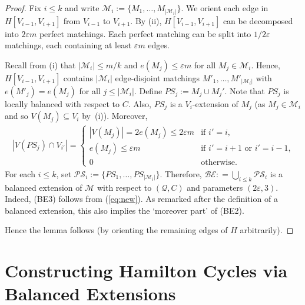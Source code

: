 \documentclass{memo-l}
\def\COMMENT#1{}
\def\eps{\varepsilon}
\numberwithin{section}{chapter}
\numberwithin{equation}{section}
\numberwithin{firstthm}{section}
\numberwithin{figure}{section}
\begin{document}
{\begin{proof}
Fix $i \le k$ and write $\mathcal{M}_i := \{ M_1, \dots, M_{|\mathcal{M}_i|}\}$.
We orient each edge in $H[V_{i-1},V_{i+1}]$ from $V_{i-1}$ to $V_{i+1}$.
By (ii), $H[V_{i-1},V_{i+1}]$ can be decomposed into $2 \eps m$ perfect matchings. 
Each perfect matching can be split into $1/2\eps $ matchings, each containing at least $ \eps m$ edges.%
    \COMMENT{Not sure why we need $1/2\eps $ instead of $1/\eps $ here. Is it because of the rounding? (Allan: Yes, it is due to rounding.)}
Recall from (i) that $|\mathcal{M}_i| \le m/k$ and $e(M_j ) \le \eps m$ for all $M_j  \in \mathcal{M}_i$.
Hence, $H[V_{i-1},V_{i+1}]$ contains $|\mathcal{M}_i|$ edge-disjoint matchings $M'_1, \dots, M'_{|\mathcal{M}_i|}$ with $e(M'_j) = e(M_j)$ for all $j \le |\mathcal{M}_i|$.
Define $PS_j:=M_j \cup M_j'$.
Note that $PS_j$ is locally balanced with respect to $C$.
Also, $PS_j$ is a $V_i$-extension of $M_j$ (as $M_j \in \mathcal{M}_i$ and so $V(M_j) \subseteq V_i$ by~(i)).
Moreover,
\begin{align}\label{eq:new}
	|V(PS_j) \cap V_{i'}|  = \begin{cases}
		|V(M_j)| =2 e(M_j ) \le 2 \eps m & \textrm{if $i' = i$,}\\
		e(M_j ) \le \eps m & \text{if $i' = i+1$ or $i' = i-1$,}\\
		0 & \text{otherwise.}
	\end{cases}
\end{align}
For each $i\le k$, set $\mathcal{PS}_i := \{ PS_1, \dots, PS_{|\mathcal{M}_i|}\}$.
Therefore, $\mathcal{BE}: = \bigcup_{i \le k} \mathcal{PS}_i$ is a balanced extension of $\mathcal{M}$ with respect to $(\mathcal{Q},C)$ and parameters $(2\eps, 3)$.
Indeed, (BE3) follows from (\ref{eq:new}). As remarked after the definition of a balanced extension, this also implies the
`moreover part' of (BE2).%
    \COMMENT{Daniela: last 2 sentences are new. Previously had "For (BE2), note that the number of $V_i$-extensions is $|\mathcal{M}_i| \le m/k$."}
Hence the lemma follows (by orienting the remaining edges of $H$ arbitrarily).
\end{proof}





\section{Constructing Hamilton Cycles via Balanced Extensions}  \label{sec:extendmerge}


}
\end{document}
